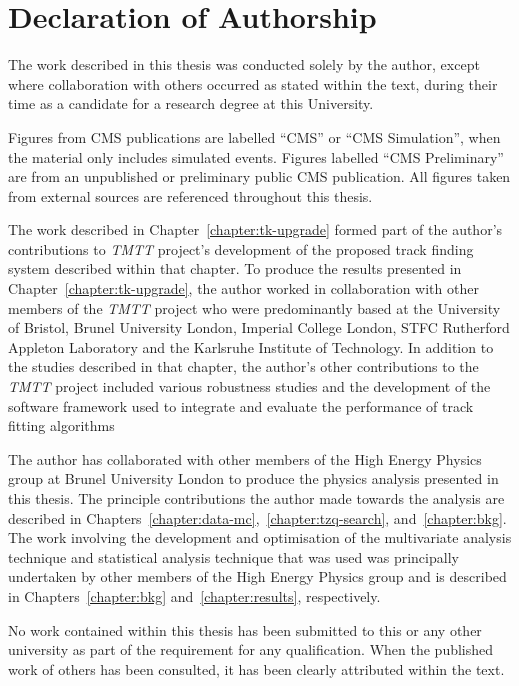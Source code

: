 \documentclass[11pt,a4paper]{report}
\begin{document}
\chapter*{Declaration of Authorship} \label{sec:declaration}
The work described in this thesis was conducted solely by the author, except where collaboration with others occurred as stated within the text, during their time as a candidate for a research degree at this University.

Figures from CMS publications are labelled ``CMS'' or ``CMS Simulation'', when the material only includes simulated events.
Figures labelled ``CMS Preliminary'' are from an unpublished or preliminary public CMS publication.
All figures taken from external sources are referenced throughout this thesis.

The work described in Chapter~\ref{chapter:tk-upgrade} formed part of the author's contributions to \emph{TMTT} project's development of the proposed track finding system described within that chapter.
To produce the results presented in Chapter~\ref{chapter:tk-upgrade}, the author worked in collaboration with other members of the \emph{TMTT} project who were predominantly based at the University of Bristol, Brunel University London, Imperial College London, STFC Rutherford Appleton Laboratory and the Karlsruhe Institute of Technology.
In addition to the studies described in that chapter, the author's other contributions to the \emph{TMTT} project included various robustness studies and the development of the software framework used to integrate and evaluate the performance of track fitting algorithms

The author has collaborated with other members of the High Energy Physics group at Brunel University London to produce the physics analysis presented in this thesis.
The principle contributions the author made towards the analysis are described in Chapters~\ref{chapter:data-mc},~\ref{chapter:tzq-search}, and~\ref{chapter:bkg}.
The work involving the development and optimisation of the multivariate analysis technique and statistical analysis technique that was used was principally undertaken by other members of the High Energy Physics group and is described in Chapters~\ref{chapter:bkg} and~\ref{chapter:results}, respectively.


No work contained within this thesis has been submitted to this or any other university as part of the requirement for any qualification.
When the published work of others has been consulted, it has been clearly attributed within the text.
\end{document}
